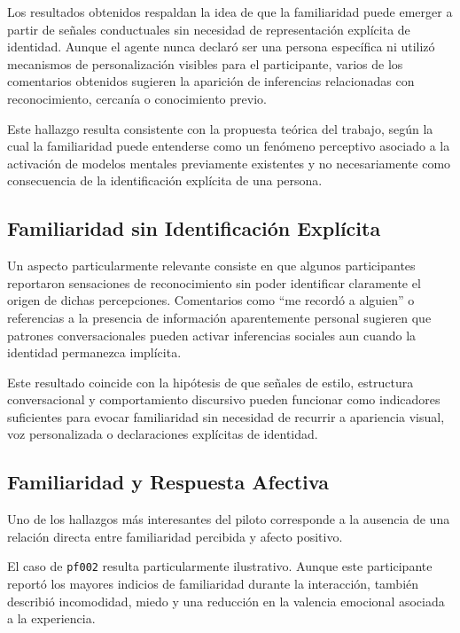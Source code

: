 \documentclass[sigconf, nonacm, language=spanish]{acmart}
\begin{document}
Los resultados obtenidos respaldan la idea de que la familiaridad puede emerger a partir de señales conductuales sin necesidad de representación explícita de identidad. Aunque el agente nunca declaró ser una persona específica ni utilizó mecanismos de personalización visibles para el participante, varios de los comentarios obtenidos sugieren la aparición de inferencias relacionadas con reconocimiento, cercanía o conocimiento previo.

Este hallazgo resulta consistente con la propuesta teórica del trabajo, según la cual la familiaridad puede entenderse como un fenómeno perceptivo asociado a la activación de modelos mentales previamente existentes y no necesariamente como consecuencia de la identificación explícita de una persona.

\subsection{Familiaridad sin Identificación Explícita}

Un aspecto particularmente relevante consiste en que algunos participantes reportaron sensaciones de reconocimiento sin poder identificar claramente el origen de dichas percepciones. Comentarios como “me recordó a alguien” o referencias a la presencia de información aparentemente personal sugieren que patrones conversacionales pueden activar inferencias sociales aun cuando la identidad permanezca implícita.

Este resultado coincide con la hipótesis de que señales de estilo, estructura conversacional y comportamiento discursivo pueden funcionar como indicadores suficientes para evocar familiaridad sin necesidad de recurrir a apariencia visual, voz personalizada o declaraciones explícitas de identidad.

\subsection{Familiaridad y Respuesta Afectiva}

Uno de los hallazgos más interesantes del piloto corresponde a la ausencia de una relación directa entre familiaridad percibida y afecto positivo.

El caso de \texttt{pf002} resulta particularmente ilustrativo. Aunque este participante reportó los mayores indicios de familiaridad durante la interacción, también describió incomodidad, miedo y una reducción en la valencia emocional asociada a la experiencia.
\end{document}

